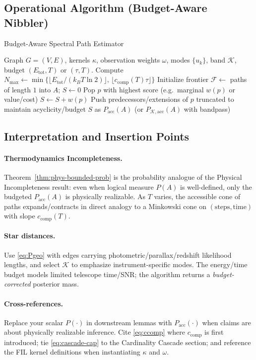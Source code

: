 \documentclass{article}
\begin{document}
\subsection{Operational Algorithm (Budget-Aware Nibbler)}
\label{subsec:algo}
\begin{algorithm}[H]
\caption{Budget-Aware Spectral Path Estimator}
\label{alg:budget-nibbler}
\begin{algorithmic}[1]
\Require Graph $G=(V,E)$, kernels $\kappa$, observation weights $\omega$, modes $\{u_k\}$,
band $\mathcal{K}$, budget $(E_{\mathrm{tot}},T)$ or $(\tau,T)$.
\State Compute $N_{\max} \leftarrow \min\!\Big\{\lfloor E_{\mathrm{tot}}/(k_BT\ln2)\rfloor,\,\lfloor c_{\mathrm{comp}}(T)\tau\rfloor\Big\}$
\State Initialize frontier $\mathcal{F}\leftarrow$ paths of length $1$ into $A$; $S\leftarrow 0$
  \State Pop $p$ with highest score (e.g.\ marginal $w(p)$ or value/cost)
  \State $S\leftarrow S + w(p)$
  \State Push predecessors/extensions of $p$ truncated to maintain acyclicity/budget
\EndWhile
\State \Return $S$ as $P_{\mathrm{acc}}(A)$ (or $P_{\mathcal{K},\mathrm{acc}}(A)$ with bandpass)
\end{algorithmic}
\end{algorithm}
\subsection{Interpretation and Insertion Points}
\label{subsec:interpretation-insertion}
\paragraph{Thermodynamics Incompleteness.}
Theorem~\ref{thm:phys-bounded-prob} is the probability analogue of the Physical Incompleteness
result: even when logical measure $P(A)$ is well-defined, only the budgeted $P_{\mathrm{acc}}(A)$ is
physically realizable. As $T$ varies, the accessible cone of paths expands/contracts in direct
analogy to a Minkowski cone on $(\mathrm{steps},\mathrm{time})$ with slope $c_{\mathrm{comp}}(T)$.
\paragraph{Star distances.}
Use \eqref{eq:Pgeo} with edges carrying photometric/parallax/redshift likelihood lengths,
and select $\mathcal{K}$ to emphasize instrument-specific modes. The energy/time budget
models limited telescope time/SNR; the algorithm returns a \emph{budget-corrected} posterior mass.
\paragraph{Cross-references.}
Replace your scalar $P(\cdot)$ in downstream lemmas with $P_{\mathrm{acc}}(\cdot)$ when claims are about
physically realizable inference. Cite \eqref{eq:ccomp} where $c_{\mathrm{comp}}$ is first introduced;
tie \eqref{eq:cascade-cap} to the Cardinality Cascade section; and reference the FIL kernel
definitions when instantiating $\kappa$ and $\omega$.
\end{document}
